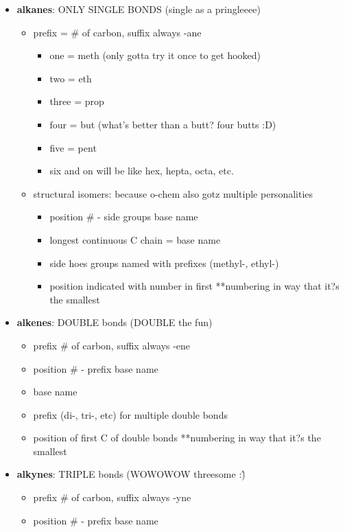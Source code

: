 \documentclass[letterpaper, 12pt]{article}
\begin{document}
	\begin{itemize}
		\item \textbf{alkanes}: ONLY SINGLE BONDS (single as a pringleeee)
		\begin{itemize}
			\item prefix = \# of carbon, suffix always -ane
			\begin{itemize}
				\item one = meth (only gotta try it once to get hooked)
				\item two =  eth
				\item three = prop
				\item four = but (what's better than a butt? four butts :D)
				\item five = pent
				\item six and on will be like hex, hepta, octa, etc.
			\end{itemize}
			\item structural isomers: because o-chem also gotz multiple personalities
			\begin{itemize}
				\item position \# - side groups base name
				\item longest continuous C chain = base name
				\item side hoes groups named with prefixes (methyl-, ethyl-)
				\item position indicated with number in first **numbering in way that it?s the smallest
			\end{itemize}
		\end{itemize}
		\item \textbf{alkenes}: DOUBLE bonds (DOUBLE the fun)
		\begin{itemize}
			\item prefix \# of carbon, suffix always -ene
			\item position \# - prefix base name
			\item base name
			\item prefix (di-, tri-, etc) for multiple double bonds
			\item position of first C of double bonds **numbering in way that it?s the smallest
		\end{itemize}
		\item \textbf{alkynes}: TRIPLE bonds (WOWOWOW threesome :\^)
		\begin{itemize}
			\item prefix \# of carbon, suffix always -yne
			\item position \# - prefix base name

\end{itemize}
\end{itemize}
\end{document}
